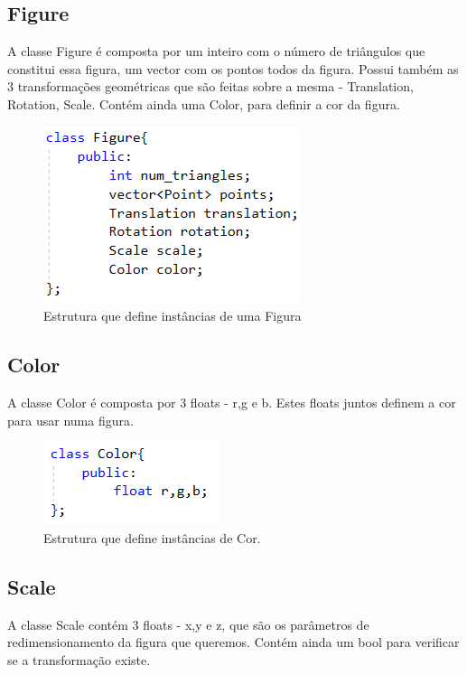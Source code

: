 \documentclass[a4paper]{article}
\begin{document}
\subsection{Figure}
\label{sec:figure}

A classe Figure é composta por um inteiro com o número de triângulos que constitui essa figura, um vector com os pontos todos da figura. Possui também as 3 transformações geométricas que são feitas sobre a mesma - Translation, Rotation, Scale. Contém ainda uma Color, para definir a cor da figura.

\begin{figure}[H]
\centering
\includegraphics[scale=0.8]{figure.png}
\caption{Estrutura que define instâncias de uma Figura}
\label{img:Figure}
\end{figure}


\subsection{Color}
\label{sec:color}

A classe Color é composta por 3 floats - r,g e b. Estes floats juntos definem a cor para usar numa figura.

\begin{figure}[H]
\centering
\includegraphics[scale=0.8]{color.png}
\caption{Estrutura que define instâncias de Cor.}
\label{img:Color}
\end{figure}


\subsection{Scale}
\label{sec:scale}

A classe Scale contém 3 floats - x,y e z, que são os parâmetros de redimensionamento da figura que queremos. Contém ainda um bool para verificar se a transformação existe.
\end{document}
